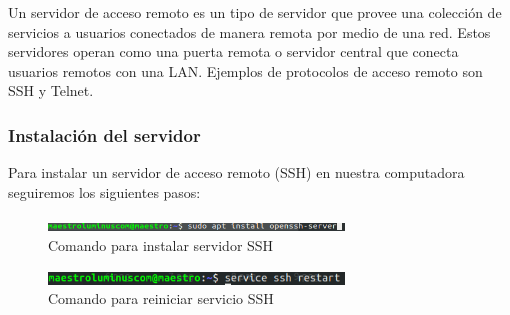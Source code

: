 Un servidor de acceso remoto es un tipo de servidor que provee una colección de servicios a usuarios conectados de manera remota por medio de una red. Estos servidores operan como una puerta remota o servidor central que conecta usuarios remotos con una LAN. Ejemplos de protocolos de acceso remoto son SSH y Telnet.
\subsubsection{Instalación del servidor}
Para instalar un servidor de acceso remoto (SSH) en nuestra computadora seguiremos los siguientes pasos:
\begin{figure}[!htbp]
	\hypertarget{fig:instalacionSSH}{\hspace{1pt}}
	\begin{center}
		\includegraphics[width=0.7\textwidth]{desarrollo/tarea2/img/instalacionSSH.png}
		\caption{Comando para instalar servidor SSH}
		\label{fig:instalacionSSH}
	\end{center}
\end{figure}
\pagebreak
\begin{figure}[!htbp]
	\hypertarget{fig:reinicioSSH}{\hspace{1pt}}
	\begin{center}
		\includegraphics[width=0.7\textwidth]{desarrollo/tarea2/img/reinicioSSH.png}
		\caption{Comando para reiniciar servicio SSH}
		\label{fig:reinicioSSH}
	\end{center}
\end{figure}
